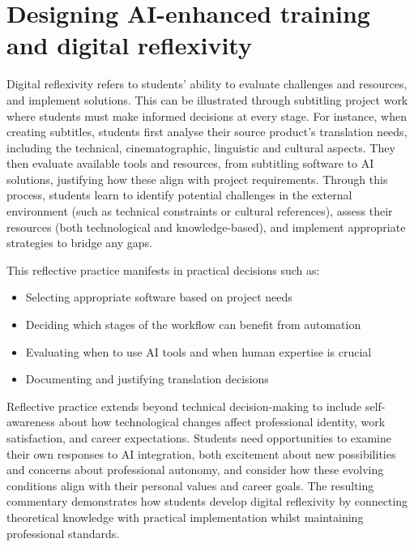 \documentclass[output=paper]{langscibook}
\begin{document}
\section{Designing AI-enhanced training and digital reflexivity}

Digital reflexivity refers to students’ ability to evaluate challenges and resources, and implement solutions. This can be illustrated through subtitling project work where students must make informed decisions at every stage. For instance, when creating subtitles, students first analyse their source product’s translation needs, including the technical, cinematographic, linguistic and cultural aspects. They then evaluate available tools and resources, from subtitling software to AI solutions, justifying how these align with project requirements. Through this process, students learn to identify potential challenges in the external environment (such as technical constraints or cultural references), assess their resources (both technological and knowledge-based), and implement appropriate strategies to bridge any gaps.

This reflective practice manifests in practical decisions such as:

\begin{itemize}
\item Selecting appropriate software based on project needs
\item Deciding which stages of the workflow can benefit from automation
\item Evaluating when to use AI tools and when human expertise is crucial
\item Documenting and justifying translation decisions
\end{itemize}

Reflective practice extends beyond technical decision-making to include self-awareness about how technological changes affect professional identity, work satisfaction, and career expectations. Students need opportunities to examine their own responses to AI integration, both excitement about new possibilities and concerns about professional autonomy, and consider how these evolving conditions align with their personal values and career goals. The resulting commentary demonstrates how students develop digital reflexivity by connecting theoretical knowledge with practical implementation whilst maintaining professional standards.
\end{document}
